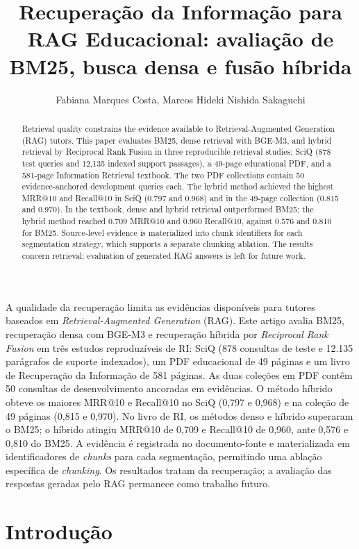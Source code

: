 \documentclass[12pt]{article}
\title{Recuperação da Informação para RAG Educacional: avaliação de BM25, busca densa e fusão híbrida}
\author{Fabiana Marques Costa\inst{1}, Marcos Hideki Nishida Sakaguchi\inst{1}}
\begin{document}
\maketitle

\begin{abstract}
Retrieval quality constrains the evidence available to Retrieval-Augmented
Generation (RAG) tutors. This paper evaluates BM25, dense retrieval with
BGE-M3, and hybrid retrieval by Reciprocal Rank Fusion in three reproducible
retrieval studies: SciQ (878 test queries and 12,135 indexed support passages),
a 49-page educational PDF, and a 581-page Information Retrieval textbook. The
two PDF collections contain 50 evidence-anchored development queries each. The
hybrid method achieved the highest MRR@10 and Recall@10 in SciQ (0.797 and
0.968) and in the 49-page collection (0.815 and 0.970). In the textbook,
dense and hybrid retrieval outperformed BM25; the hybrid method reached 0.709
MRR@10 and 0.960 Recall@10, against 0.576 and 0.810 for BM25. Source-level
evidence is materialized into chunk identifiers for each segmentation strategy,
which supports a separate chunking ablation. The results concern retrieval;
evaluation of generated RAG answers is left for future work.
\end{abstract}

\begin{resumo}
A qualidade da recuperação limita as evidências disponíveis para tutores
baseados em \textit{Retrieval-Augmented Generation} (RAG). Este artigo avalia
BM25, recuperação densa com BGE-M3 e recuperação híbrida por \textit{Reciprocal
Rank Fusion} em três estudos reproduzíveis de RI: SciQ (878 consultas de teste
e 12.135 parágrafos de suporte indexados), um PDF educacional de 49 páginas e
um livro de Recuperação da Informação de 581 páginas. As duas coleções em PDF
contêm 50 consultas de desenvolvimento ancoradas em evidências. O método
híbrido obteve os maiores MRR@10 e Recall@10 no SciQ (0,797 e 0,968) e na
coleção de 49 páginas (0,815 e 0,970). No livro de RI, os métodos denso e
híbrido superaram o BM25; o híbrido atingiu MRR@10 de 0,709 e Recall@10 de
0,960, ante 0,576 e 0,810 do BM25. A evidência é registrada no documento-fonte
e materializada em identificadores de \textit{chunks} para cada segmentação,
permitindo uma ablação específica de \textit{chunking}. Os resultados tratam
da recuperação; a avaliação das respostas geradas pelo RAG permanece como
trabalho futuro.
\end{resumo}

\section{Introdução}
\end{document}
